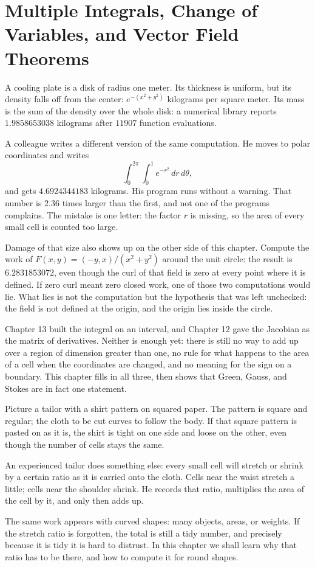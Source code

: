 \chapter{Multiple Integrals, Change of Variables, and Vector Field Theorems}

A cooling plate is a disk of radius one meter. Its thickness is
uniform, but its density falls off from the center: $e^{-(x^{2}+y^{2})}$ kilograms
per square meter. Its mass is the sum of the density over the whole disk: a numerical library reports
$1.9858653038$ kilograms after $11907$ function evaluations.

A colleague writes a different version of the same computation. He moves to
polar coordinates and writes
\[
\int_{0}^{2\pi}\!\!\int_{0}^{1} e^{-r^{2}}\,dr\,d\theta ,
\]
and gets $4.6924344183$ kilograms. His program runs without a warning.
That number is $2.36$ times larger than the first, and not one of the
programs complains. The mistake is one letter: the factor $r$ is missing, so the area
of every small cell is counted too large.

Damage of that size also shows up on the other side of this chapter. Compute the work of
$F(x,y)=(-y,x)/(x^{2}+y^{2})$ around the unit circle: the result is
$6.2831853072$, even though the curl of that field is zero at every point where it
is defined. If zero curl meant zero closed work, one of those two computations
would lie. What lies is not the computation but the hypothesis that was left
unchecked: the field is not defined at the origin, and the origin lies inside
the circle.

Chapter 13 built the integral on an interval, and Chapter 12 gave the Jacobian as the
matrix of derivatives. Neither is enough yet: there is still no way to add up over a region
of dimension greater than one, no rule for what happens to the area of a cell
when the coordinates are changed, and no meaning for the sign on a boundary. This chapter
fills in all three, then shows that Green, Gauss, and Stokes are in fact one
statement.

\begin{untukanak}
Picture a tailor with a shirt pattern on squared paper. The pattern is square
and regular; the cloth to be cut curves to follow the body. If that square pattern
is pasted on as it is, the shirt is tight on one side and loose on the other,
even though the number of cells stays the same.

An experienced tailor does something else: every small cell will stretch
or shrink by a certain ratio as it is carried onto the cloth. Cells near the waist stretch
a little; cells near the shoulder shrink. He records that ratio, multiplies the area
of the cell by it, and only then adds up.

The same work appears with curved shapes: many objects, areas, or weights.
If the stretch ratio is forgotten, the total is still a tidy number, and
precisely because it is tidy it is hard to distrust. In this chapter we shall learn why
that ratio has to be there, and how to compute it for round shapes.
\end{untukanak}

